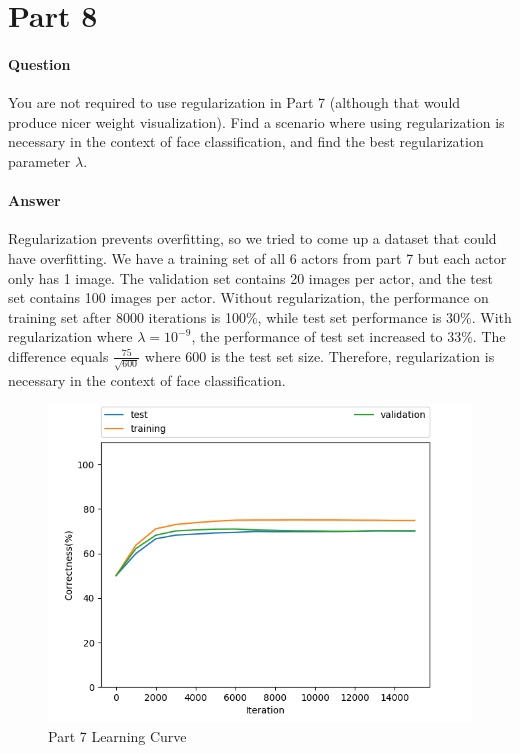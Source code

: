 \documentclass[11pt,twoside]{article}
\begin{document}
\clearpage

\section*{Part 8}
\paragraph{Question}
You are not required to use regularization in Part 7 (although that would produce nicer weight visualization). Find a scenario where using regularization is necessary in the context of face classification, and find the best regularization parameter $\lambda$.

\paragraph{Answer}
Regularization prevents overfitting, so we tried to come up a dataset that could have overfitting. We have a training set of all 6 actors from part 7 but each actor only has 1 image. The validation set contains 20 images per actor, and the test set contains 100 images per actor. Without regularization, the performance on training set after 8000 iterations is 100\%, while test set performance is 30\%. With regularization where $\lambda = 10^{-9}$, the performance of test set increased to 33\%. The difference equals $\frac{75}{\sqrt{600}}$ where 600 is the test set size. Therefore, regularization is necessary in the context of face classification.

\begin{figure}[h]
	\centering
	\includegraphics[scale=0.8]{part7.png}
	\caption*{Part 7 Learning Curve}
\end{figure}
\end{document}
